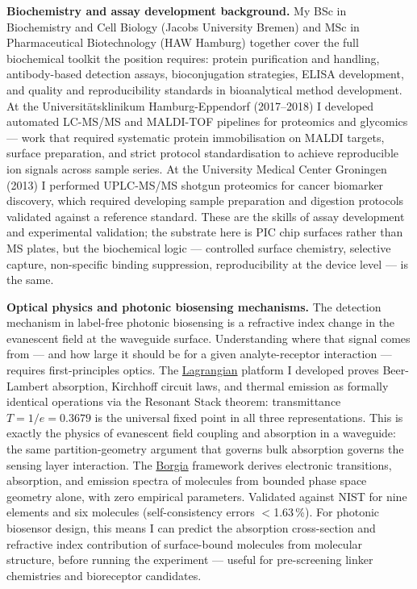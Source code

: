 \documentclass[12pt,a4paper]{article}
\begin{document}
\textbf{Biochemistry and assay development background.}
My BSc in Biochemistry and Cell Biology (Jacobs University Bremen) and
MSc in Pharmaceutical Biotechnology (HAW Hamburg) together cover the
full biochemical toolkit the position requires: protein purification and
handling, antibody-based detection assays, bioconjugation strategies,
ELISA development, and quality and reproducibility standards in bioanalytical
method development.
At the Universitätsklinikum Hamburg-Eppendorf (2017--2018) I developed
automated LC-MS/MS and MALDI-TOF pipelines for proteomics and glycomics ---
work that required systematic protein immobilisation on MALDI targets,
surface preparation, and strict protocol standardisation to achieve
reproducible ion signals across sample series.
At the University Medical Center Groningen (2013) I performed UPLC-MS/MS
shotgun proteomics for cancer biomarker discovery, which required developing
sample preparation and digestion protocols validated against a reference
standard. These are the skills of assay development and experimental
validation; the substrate here is PIC chip surfaces rather than MS plates,
but the biochemical logic --- controlled surface chemistry, selective
capture, non-specific binding suppression, reproducibility at the device
level --- is the same.

\textbf{Optical physics and photonic biosensing mechanisms.}
The detection mechanism in label-free photonic biosensing is a refractive
index change in the evanescent field at the waveguide surface.
Understanding where that signal comes from --- and how large it should be
for a given analyte-receptor interaction --- requires first-principles optics.
The \href{https://github.com/fullscreen-triangle/lagrangian}{Lagrangian}
platform I developed proves Beer-Lambert absorption, Kirchhoff circuit laws,
and thermal emission as formally identical operations via the Resonant Stack
theorem: transmittance $T = 1/e = 0.3679$ is the universal fixed point in all
three representations. This is exactly the physics of evanescent field coupling
and absorption in a waveguide: the same partition-geometry argument that governs
bulk absorption governs the sensing layer interaction.
The \href{https://honjo-masamune.vercel.app/tools}{Borgia} framework derives
electronic transitions, absorption, and emission spectra of molecules from
bounded phase space geometry alone, with zero empirical parameters.
Validated against NIST for nine elements and six molecules (self-consistency
errors $<$1.63\,\%). For photonic biosensor design, this means I can predict
the absorption cross-section and refractive index contribution of surface-bound
molecules from molecular structure, before running the experiment --- useful for
pre-screening linker chemistries and bioreceptor candidates.
\end{document}
